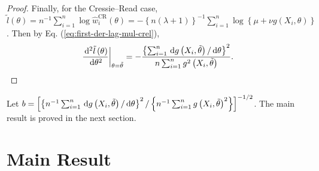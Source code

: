 \begin{proof}
Finally, for the Cressie--Read case, $\tilde{l}\left(\theta\right)=n^{-1}\sum_{i=1}^{n}\log\hat{w}_{i}^{\mathrm{CR}}\left(\theta\right)=-\left\{ n\left(\lambda+1\right)\right\} ^{-1}\sum_{i=1}^{n}\log\left\{ \mu+\nu g\left(X_{i},\theta\right)\right\} $.
Then by Eq. (\ref{eq:first-der-lag-mul-crel}), 
\[
\left.\frac{\,\mathrm{d}^{2}\tilde{l}\left(\theta\right)}{\,\mathrm{d}\theta^{2}}\right|_{\theta=\tilde{\theta}}=-\frac{\left\{ \sum_{i=1}^{n}\,\mathrm{d} g\left(X_{i},\tilde{\theta}\right)/\,\mathrm{d}\theta\right\} ^{2}}{n\sum_{i=1}^{n}g^{2}\left(X_{i},\tilde{\theta}\right)}.
\]

\end{proof}
Let $b=\left[\left\{ n^{-1}\sum_{i=1}^{n}\,\mathrm{d} g\left(X_{i},\tilde{\theta}\right)/\,\mathrm{d}\theta\right\} ^{2}/\left\{ n^{-1}\sum_{i=1}^{n}g\left(X_{i},\tilde{\theta}\right)^{2}\right\} \right]^{-1/2}$.
The main result is proved in the next section.


\section{Main Result}

